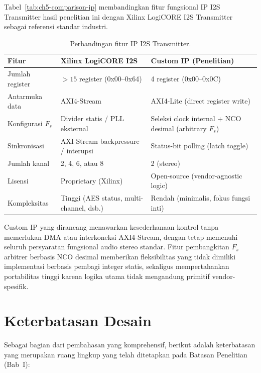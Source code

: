 Tabel~\ref{tab:ch5-comparison-ip} membandingkan fitur fungsional IP I2S Transmitter hasil penelitian ini dengan Xilinx LogiCORE I2S Transmitter \citep{amd_pg308_i2s_logicore} sebagai referensi standar industri.

\begin{table}[htbp]
	\centering
	\caption{Perbandingan fitur IP I2S Transmitter.}
	
	\begin{tabular}{|l|p{5cm}|p{5cm}|}
		\hline
		\textbf{Fitur} & \textbf{Xilinx LogiCORE I2S} & \textbf{Custom IP (Penelitian)} \\
		\hline
		Jumlah register     & $>15$ register (0x00--0x64)
		& 4 register (0x00--0x0C) \\
		Antarmuka data      & AXI4-Stream
		& AXI4-Lite (direct register write) \\
		Konfigurasi $F_s$   & Divider statis / PLL eksternal
		& Seleksi clock internal + NCO desimal (arbitrary $F_s$) \\
		Sinkronisasi        & AXI-Stream backpressure / interupsi
		& Status-bit polling (latch toggle) \\
		Jumlah kanal        & 2, 4, 6, atau 8
		& 2 (stereo) \\
		Lisensi             & Proprietary (Xilinx)
		& Open-source (vendor-agnostic logic) \\
		Kompleksitas        & Tinggi (AES status, multi-channel, dsb.)
		& Rendah (minimalis, fokus fungsi inti) \\
		\hline
	\end{tabular}
\end{table}

Custom IP yang dirancang menawarkan kesederhanaan kontrol tanpa memerlukan DMA atau interkoneksi AXI4-Stream, dengan tetap memenuhi seluruh persyaratan fungsional audio stereo standar. Fitur pembangkitan $F_s$ arbitrer berbasis NCO desimal memberikan fleksibilitas yang tidak dimiliki implementasi berbasis pembagi integer statis, sekaligus mempertahankan portabilitas tinggi karena logika utama tidak mengandung primitif vendor-spesifik.

\section{Keterbatasan Desain}

Sebagai bagian dari pembahasan yang komprehensif, berikut adalah keterbatasan yang merupakan ruang lingkup yang telah ditetapkan pada Batasan Penelitian (Bab~I):

